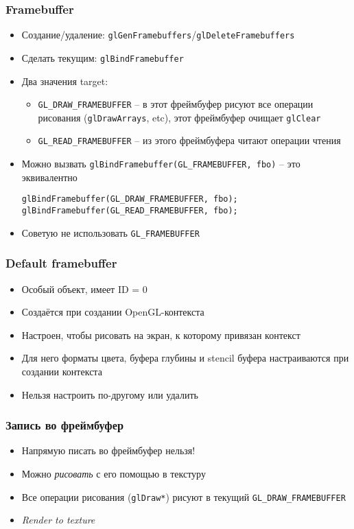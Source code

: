 \documentclass{beamer}
\begin{document}
\begin{frame}[fragile]
\frametitle{Framebuffer}
\begin{itemize}
\item Создание/удаление: \verb|glGenFramebuffers|/\verb|glDeleteFramebuffers|
\pause
\item Сделать текущим: \verb|glBindFramebuffer|
\pause
\item Два значения target:
\begin{itemize}
\item \verb|GL_DRAW_FRAMEBUFFER| -- в этот фреймбуфер рисуют все операции рисования (\verb|glDrawArrays|, etc), этот фреймбуфер очищает \verb|glClear|
\pause
\item \verb|GL_READ_FRAMEBUFFER| -- из этого фреймбуфера читают операции чтения
\end{itemize}  
\pause
\item Можно вызвать \verb|glBindFramebuffer(GL_FRAMEBUFFER, fbo)| -- это эквивалентно
\begin{verbatim}
glBindFramebuffer(GL_DRAW_FRAMEBUFFER, fbo);
glBindFramebuffer(GL_READ_FRAMEBUFFER, fbo);
\end{verbatim}
\item Советую не использовать \verb|GL_FRAMEBUFFER|
\end{itemize}
\end{frame}

\begin{frame}[fragile]
\frametitle{Default framebuffer}
\begin{itemize}
\item Особый объект, имеет ID = 0
\pause
\item Создаётся при создании OpenGL-контекста
\pause
\item Настроен, чтобы рисовать на экран, к которому привязан контекст
\pause
\item Для него форматы цвета, буфера глубины и stencil буфера настраиваются при создании контекста
\pause
\item Нельзя настроить по-другому или удалить
\end{itemize}
\end{frame}

\begin{frame}[fragile]
\frametitle{Запись во фреймбуфер}
\begin{itemize}
\item Напрямую писать во фреймбуфер нельзя!
\pause
\item Можно \textit{рисовать} с его помощью в текстуру
\item Все операции рисования (\verb|glDraw*|) рисуют в текущий \verb|GL_DRAW_FRAMEBUFFER|
\item \textit{Render to texture}
\end{itemize}
\end{frame}
\end{document}
